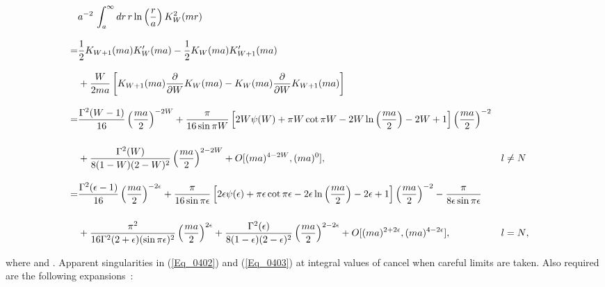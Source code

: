 \documentclass[a4paper,twocolumn,showpacs,preprintnumbers,amsmath,amssymb]{revtex4}
\providecommand{\half}{\frac{1}{2}}
\providecommand{\pdo}[1]{\ensuremath{\frac{\partial }
        {\partial #1 }}}
\begin{document}
\begin{widetext}
\begin{alignat}{2}
\label{Eq_0401}
\nonumber
\lefteqn{a^{-2} \,
 \int^{\infty}_a dr \, r \ln \left(\frac{r}{a}\right) K^2_W(mr)}\\[3mm]
\nonumber
  =& \half K_{W+1}(ma) K'_W(ma) - \half K_W(ma) K'_{W+1}(ma)&&\\[3mm]
  &  + \frac{W}{2ma}
  \left[
  K_{W+1}(ma) \pdo{W}K_W(ma) - K_W(ma) \pdo{W}K_{W+1}(ma)
  \right]&&\\[3mm]
\label{Eq_0402}
\nonumber
  =& \frac{\Gamma^2(W-1)}{16} \left(\frac{ma}{2}\right)^{-2W}
  + \frac{\pi}{16 \sin \pi W}
  \left[
  2W \psi(W) + \pi W \cot \pi W
  - 2W \ln \left(\frac{ma}{2}\right) - 2W + 1
  \right]
  \left(\frac{ma}{2}\right)^{-2}&\\[5mm]
  &
  + \frac{\Gamma^2(W)}{8 (1-W) (2-W)^2} \left(\frac{ma}{2}\right)^{2-2W}
  + O[(ma)^{4-2W}, (ma)^0],& l \neq N&\\[3mm]
\label{Eq_0403}
\nonumber
  =& \frac{\Gamma^2(\epsilon - 1)}{16}
  \left(\frac{ma}{2}\right)^{-2\epsilon} + \frac{\pi}{16 \sin \pi\epsilon}
  \left[
  2\epsilon \psi(\epsilon) + \pi \epsilon \cot \pi \epsilon
  - 2 \epsilon \ln \left(\frac{ma}{2}\right) - 2 \epsilon + 1
  \right]
  \left(\frac{ma}{2}\right)^{-2}
  - \frac{\pi}{8 \epsilon \sin \pi \epsilon}&&\\[5mm]
  &
  + \frac{\pi^2}{16\Gamma^2(2 + \epsilon)(\sin \pi \epsilon)^2}
  \left(\frac{ma}{2}\right)^{2\epsilon}
  + \frac{\Gamma^2(\epsilon)}{8(1-\epsilon)(2-\epsilon)^2}
    \left(\frac{ma}{2}\right)^{2-2\epsilon}
  + O[(ma)^{2 + 2\epsilon}, (ma)^{4-2\epsilon}],& l = N&,
\end{alignat}
\end{widetext}


\noindent
where \coordHE{} and
\coordHE{}. Apparent singularities in (\ref{Eq_0402}) and
(\ref{Eq_0403}) at integral values of \coordHE{} cancel when careful limits
are taken. Also required are the following
expansions~\cite{Abramowitz64}:
\end{document}
